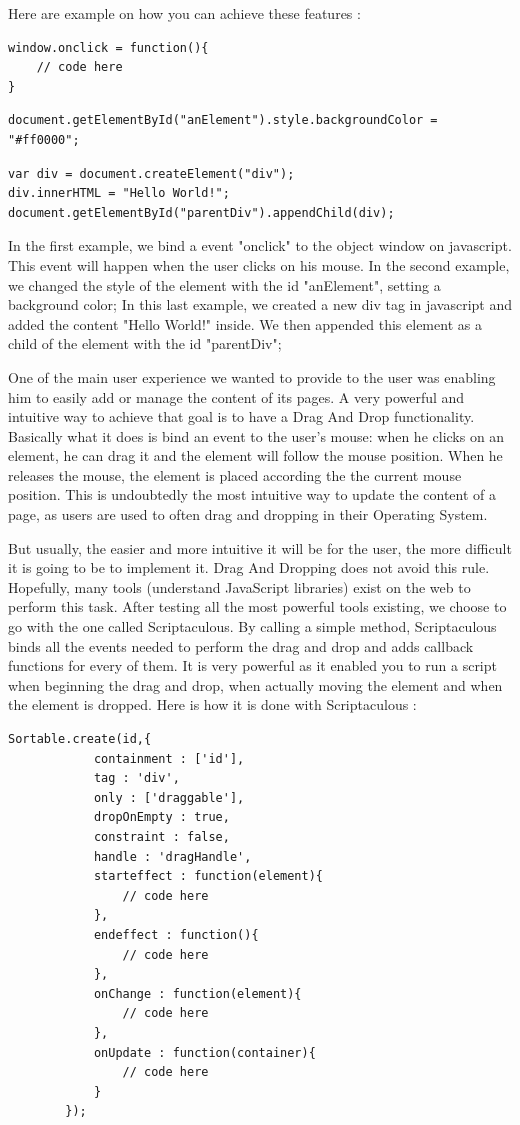 Here are example on how you can achieve these features :
\lstset{language=Javascript}
\begin{lstlisting}[label=javascript_event,caption=Binding an event in Javascript]
window.onclick = function(){
	// code here
}
\end{lstlisting}
\begin{lstlisting}[label=javascript_appearance,caption=Modifying the css of an element ]
document.getElementById("anElement").style.backgroundColor = "#ff0000";
\end{lstlisting}
\begin{lstlisting}[label=javascript_dom,caption=Handling the DOM]
var div = document.createElement("div");
div.innerHTML = "Hello World!";
document.getElementById("parentDiv").appendChild(div);
\end{lstlisting}

In the first example, we bind a event "onclick" to the object window on javascript. This event will happen when the user clicks on his mouse.
In the second example, we changed the style of the element with the id "anElement", setting a background color;
In this last example, we created a new div tag in javascript and added the content "Hello World!" inside. We then appended this element as a child of the element with the id "parentDiv";

One of the main user experience we wanted to provide to the user was enabling him to easily add or manage the content of its pages. A very powerful and intuitive way to achieve that goal is to have a Drag And Drop functionality. Basically what it does is bind an event to the user's mouse: when he clicks on an element, he can drag it and the element will follow the mouse position. When he releases the mouse, the element is placed according the the current mouse position. This is undoubtedly the most intuitive way to update the content of a page, as users are used to often drag and dropping in their Operating System. 

But usually, the easier and more intuitive it will be for the user, the more difficult it is going to be to implement it. Drag And Dropping does not avoid this rule. Hopefully, many tools (understand JavaScript libraries) exist on the web to perform this task. After testing all the most powerful tools existing, we choose to go with the one called Scriptaculous. By calling a simple method, Scriptaculous binds all the events needed to perform the drag and drop and adds callback functions for every of them. It is very powerful as it enabled you to run a script when beginning the drag and drop, when actually moving the element and when the element is dropped.
Here is how it is done with Scriptaculous :
 \lstset{language=Javascript}
\begin{lstlisting}[label=scriptaculous,caption=Drag And Dropping with scriptaculous]
Sortable.create(id,{
			containment : ['id'],
			tag : 'div',
			only : ['draggable'],
			dropOnEmpty : true,
			constraint : false,
			handle : 'dragHandle',
			starteffect : function(element){
				// code here
			},
			endeffect : function(){
				// code here
			},
			onChange : function(element){
				// code here
			},
			onUpdate : function(container){	
				// code here
			}
		});
\end{lstlisting}


